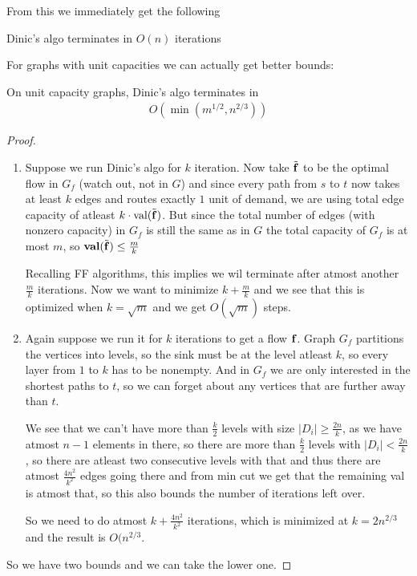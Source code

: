 \obvs

From this we immediately get the following

\begin{izrek}
    Dinic's algo terminates in $O(n)$ iterations
\end{izrek}

\obvs

For graphs with unit capacities we can actually get better bounds:

\begin{izrek}
    On unit capacity graphs, Dinic's algo terminates in
    \begin{align*}
        O ( \min (m^{1/2}, n^{2/3}))
    \end{align*}
\end{izrek}

\begin{proof}
    \begin{enumerate}
        \item Suppose we run Dinic's algo for $k$ iteration. Now take $\Tilde{\mathbf{f}}$ to be the optimal flow in $G_f$ (watch out, not in $G$) and since every path from $s$ to $t$ now takes at least $k$ edges and routes exactly $1$ unit of demand, we are using total edge capacity of 
        atleast $k \cdot \text{val} (\Tilde{\mathbf{f}})$. But since the total number of edges (with nonzero capacity) in $G_f$ is still the same as in $G$ 
        the total capacity of $G_f$ is at most $m$, so 
        $\textbf{val} (\Tilde{\mathbf{f}}) \leq \frac{m}{k}$

        Recalling FF algorithms, this implies we wil terminate after atmost another $\frac m k$ iterations. Now we want to minimize $k + \frac m k$ and we see that this is optimized when $k = \sqrt{m}$ and we get $O(\sqrt{m})$ steps.

        \item Again suppose we run it for $k$ iterations to get a flow $\mathbf{f}$. Graph $G_f$ partitions the vertices into levels, so the sink must be at the level atleast $k$, so every layer from $1$ to $k$ has to be nonempty. And in $G_f$ we are only interested in the shortest paths to $t$, so we can forget about any vertices that are further away than $t$.

        We see that we can't have more than $\frac k 2$ levels with size $|D_i| \geq \frac{2n}{k}$, as we have atmost $n-1$ elements in there, so there are more than $\frac k 2$ levels with $|D_i| < \frac{2n}{k}$, so there are atleast two consecutive levels with that and thus there are atmost $\frac{4n^2}{k^2}$ edges going there and from min cut we get that the remaining val is atmost that, so this also bounds the number of iterations left over.

        So we need to do atmost $k + \frac{4n^2}{k^2}$ iterations, which is minimized at $k = 2n^{2/3}$ and the result is $O(n^{2/3}$.
    \end{enumerate}
    So we have two bounds and we can take the lower one.
\end{proof}


